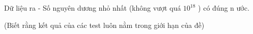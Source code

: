 Dữ liệu ra
- Số nguyên dương nhỏ nhất (không vượt quá $10^{18}$   ) có đúng n ước.   


   (Biết rằng kết quả của các test luôn nằm trong giới hạn của đề)